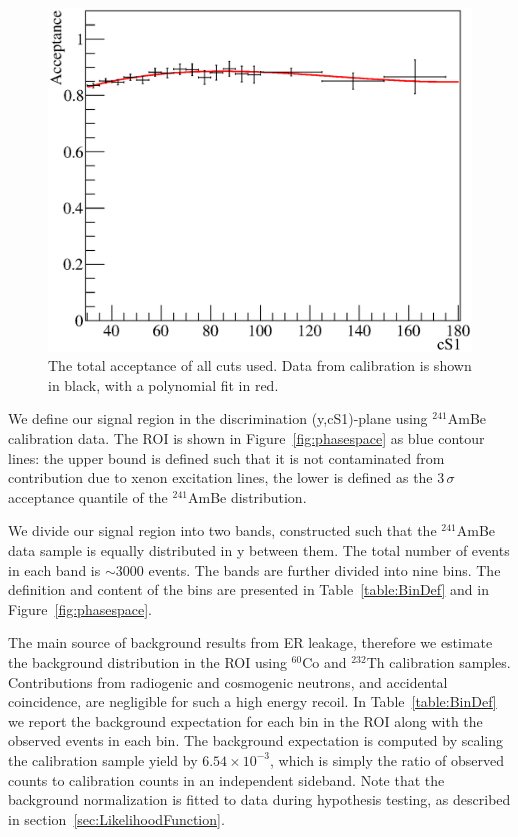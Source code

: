 \begin{figure}[t!]
\begin{minipage}{0.9\linewidth}
\centerline{\includegraphics[width=1.\linewidth]{Figures/Acceptance.eps}}
\end{minipage}
\caption{The total acceptance of all cuts used. Data from calibration is shown in black, with a polynomial fit in red.}
\label{fig:Acc}
\end{figure}

We define our signal region in the discrimination (y,cS1)-plane using $^{241}$AmBe calibration data. 
The ROI is shown in Figure~\ref{fig:phasespace} as blue contour lines: the upper bound is defined such that it is not contaminated from contribution due to xenon excitation lines, the lower is defined as the 3\,$\sigma$ acceptance quantile of the $^{241}$AmBe distribution.

We divide our signal region into two bands, constructed such that the $^{241}$AmBe data sample is equally distributed in y between them. The total number of events in each band is $\sim3000$ events. The bands are further divided into nine bins. The definition and content of the bins are presented in Table~\ref{table:BinDef} and in Figure~\ref{fig:phasespace}. 



The main source of background results from ER leakage, therefore we estimate the background distribution in the ROI using $^{60}$Co and $^{232}$Th calibration samples.  
Contributions from radiogenic and cosmogenic neutrons, and accidental coincidence, are negligible for such a high energy recoil. In Table~\ref{table:BinDef} we report the background expectation for each bin in the ROI along with the observed events in each bin. The background expectation is computed by scaling the calibration sample yield by $6.54\times10^{-3}$, which is simply the ratio of observed counts to calibration counts in an independent sideband. Note that the background normalization is fitted to data during hypothesis testing, as described in section~\ref{sec:LikelihoodFunction}. 

